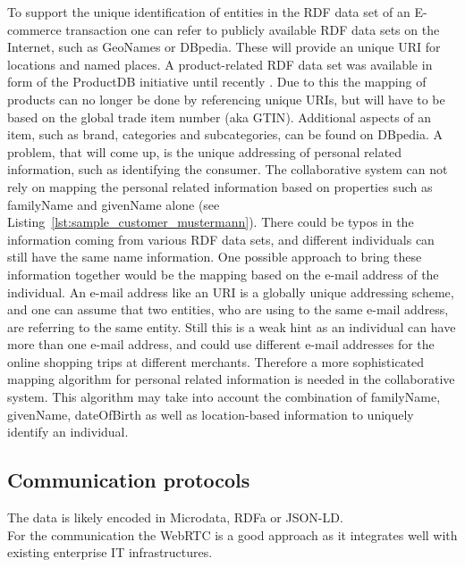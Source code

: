 To support the unique identification of entities in the \gls{RDF} data set of an \gls{E-commerce} transaction one can refer to publicly available \gls{RDF} data sets on the Internet, such as GeoNames or DBpedia. These will provide an unique \gls{URI} for locations and named places. A product-related \gls{RDF} data set was available in form of the ProductDB initiative until recently \citep{bouzidi2014product}. Due to this the mapping of products can no longer be done by referencing unique \gls{URI}s, but will have to be based on the global trade item number (aka \gls{GTIN}). Additional aspects of an item, such as brand, categories and subcategories, can be found on DBpedia. A problem, that will come up, is the unique addressing of personal related information, such as identifying the consumer. The collaborative system can not rely on mapping the personal related information based on properties such as familyName and givenName alone (see Listing~\ref{lst:sample_customer_mustermann}). There could be typos in the information coming from various \gls{RDF} data sets, and different individuals can still have the same name information. One possible approach to bring these information together would be the mapping based on the e-mail address of the individual. An e-mail address like an \gls{URI} is a globally unique addressing scheme, and one can assume that two entities, who are using to the same e-mail address, are referring to the same entity. Still this is a weak hint as an individual can have more than one e-mail address, and could use different e-mail addresses for the online shopping trips at different merchants. Therefore a more sophisticated mapping algorithm for personal related information is needed in the collaborative system. This algorithm may take into account the combination of familyName, givenName, dateOfBirth as well as location-based information to uniquely identify an individual.


\subsection{Communication protocols}
\label{subsec:comm_protocol}

 The data is likely encoded in Microdata, \gls{RDFa} or \gls{JSON-LD}. \\

For the communication the \gls{WebRTC} is a good approach as it integrates well with existing enterprise IT infrastructures.
\\

